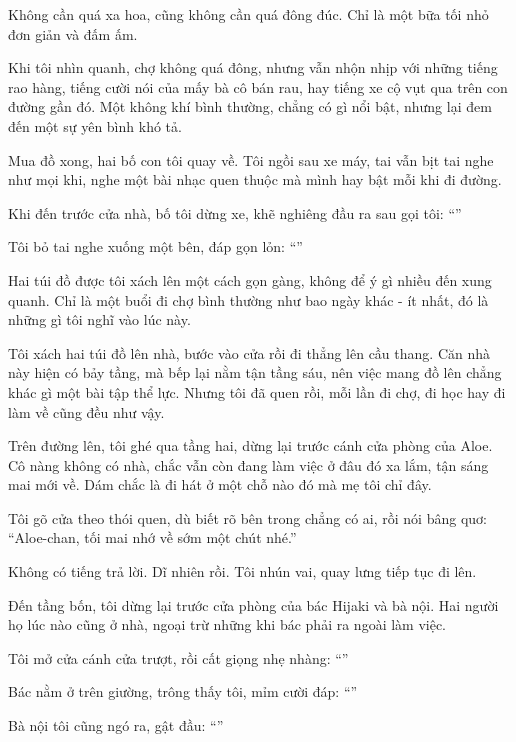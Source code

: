 \documentclass[../main.tex]{subfiles}
\begin{document}
Không cần quá xa hoa, cũng không cần quá đông đúc. Chỉ là một bữa tối nhỏ đơn giản và đấm ấm.

Khi tôi nhìn quanh, chợ không quá đông, nhưng vẫn nhộn nhịp với những tiếng rao hàng, tiếng cười nói của mấy bà cô bán rau, hay tiếng xe cộ vụt qua trên con đường gần đó. Một không khí bình thường, chẳng có gì nổi bật, nhưng lại đem đến một sự yên bình khó tả.

Mua đồ xong, hai bố con tôi quay về. Tôi ngồi sau xe máy, tai vẫn bịt tai nghe như mọi khi, nghe một bài nhạc quen thuộc mà mình hay bật mỗi khi đi đường.

Khi đến trước cửa nhà, bố tôi dừng xe, khẽ nghiêng đầu ra sau gọi tôi: ``''

Tôi bỏ tai nghe xuống một bên, đáp gọn lỏn: ``''

Hai túi đồ được tôi xách lên một cách gọn gàng, không để ý gì nhiều đến xung quanh. Chỉ là một buổi đi chợ bình thường như bao ngày khác - ít nhất, đó là những gì tôi nghĩ vào lúc này.

\ct

Tôi xách hai túi đồ lên nhà, bước vào cửa rồi đi thẳng lên cầu thang. Căn nhà này hiện có bảy tầng, mà bếp lại nằm tận tầng sáu, nên việc mang đồ lên chẳng khác gì một bài tập thể lực. Nhưng tôi đã quen rồi, mỗi lần đi chợ, đi học hay đi làm về cũng đều như vậy.

Trên đường lên, tôi ghé qua tầng hai, dừng lại trước cánh cửa phòng của Aloe. Cô nàng không có nhà, chắc vẫn còn đang làm việc ở đâu đó xa lắm, tận sáng mai mới về. Dám chắc là đi hát ở một chỗ nào đó mà mẹ tôi chỉ đây.

Tôi gõ cửa theo thói quen, dù biết rõ bên trong chẳng có ai, rồi nói bâng quơ: ``Aloe-chan, tối mai nhớ về sớm một chút nhé.''

Không có tiếng trả lời. Dĩ nhiên rồi. Tôi nhún vai, quay lưng tiếp tục đi lên.

Đến tầng bốn, tôi dừng lại trước cửa phòng của bác Hijaki và bà nội. Hai người họ lúc nào cũng ở nhà, ngoại trừ những khi bác phải ra ngoài làm việc.

Tôi mở cửa cánh cửa trượt, rồi cất giọng nhẹ nhàng: ``''

Bác nằm ở trên giường, trông thấy tôi, mỉm cười đáp: ``''

Bà nội tôi cũng ngó ra, gật đầu: ``''
\end{document}
